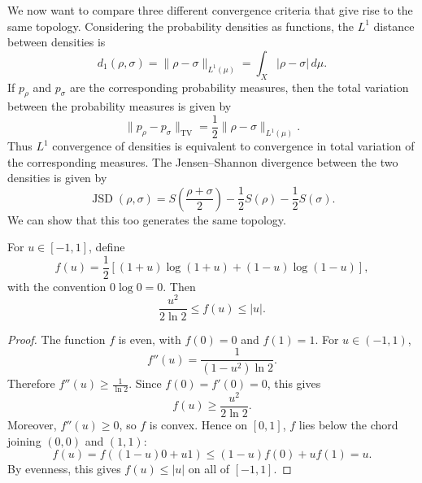 \documentclass{techbrief}
\begin{document}
	We now want to compare three different convergence criteria that give rise to the same topology. Considering the probability densities as functions, the $L^1$ distance between densities is
	\begin{equation}
		d_1(\rho,\sigma)=\|\rho-\sigma\|_{L^1(\mu)}
		=
		\int_X |\rho-\sigma|\,d\mu.
	\end{equation}
	If $p_\rho$ and $p_\sigma$ are the corresponding probability measures, then the total variation between the probability measures is given by
	\begin{equation}
		\|p_\rho-p_\sigma\|_{\mathrm{TV}}
		=
		\frac{1}{2}\|\rho-\sigma\|_{L^1(\mu)}.
	\end{equation}
	Thus $L^1$ convergence of densities is equivalent to convergence in total variation of the corresponding measures. The Jensen--Shannon divergence between the two densities is given by
	\begin{equation}
		\operatorname{JSD}(\rho,\sigma)
		=
		S\left(\frac{\rho+\sigma}{2}\right)
		-
		\frac{1}{2}S(\rho)
		-
		\frac{1}{2}S(\sigma).
	\end{equation}
	We can show that this too generates the same topology.

\begin{lemma}
	For $u\in[-1,1]$, define
	\begin{equation}
		f(u)
		=
		\frac{1}{2}
		\left[
		(1+u)\log(1+u)
		+
		(1-u)\log(1-u)
		\right],
	\end{equation}
	with the convention $0\log 0=0$. Then
	\begin{equation}
		\frac{u^2}{2\ln 2}
		\leq
		f(u)
		\leq
		|u|.
	\end{equation}
\end{lemma}

\begin{proof}
	The function $f$ is even, with $f(0)=0$ and $f(1)=1$. For $u\in(-1,1)$,
	\begin{equation}
		f''(u)=\frac{1}{(1-u^2)\ln 2}.
	\end{equation}
	Therefore $f''(u)\geq \frac{1}{\ln 2}$. Since $f(0)=f'(0)=0$, this gives
	\begin{equation}
		f(u)\geq \frac{u^2}{2\ln 2}.
	\end{equation}
	Moreover, $f''(u)\geq0$, so $f$ is convex. Hence on $[0,1]$, $f$ lies below the chord joining $(0,0)$ and $(1,1)$:
	\begin{equation}
		f(u) = f( (1-u) 0 + u 1 )\leq (1-u)f(0) + u f(1) = u.
	\end{equation}
	By evenness, this gives $f(u)\leq |u|$ on all of $[-1,1]$.
\end{proof}
\end{document}

